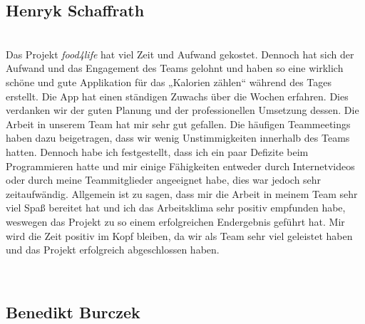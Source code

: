 \subsection{Henryk Schaffrath}\\
Das Projekt
\textit{food4life}  hat viel Zeit und Aufwand gekostet. Dennoch hat sich der Aufwand und das Engagement des Teams gelohnt und haben so eine wirklich schöne und gute Applikation für das „Kalorien zählen“ während des Tages erstellt. Die App hat einen ständigen Zuwachs über die Wochen erfahren. Dies verdanken wir der guten Planung und der professionellen Umsetzung dessen. Die Arbeit in unserem Team hat mir sehr gut gefallen. Die häufigen Teammeetings haben dazu beigetragen, dass wir wenig Unstimmigkeiten innerhalb des Teams hatten. Dennoch habe ich festgestellt, dass ich ein paar Defizite beim Programmieren hatte und mir einige Fähigkeiten entweder durch Internetvideos oder durch meine Teammitglieder angeeignet habe, dies war jedoch sehr zeitaufwändig. 
Allgemein ist zu sagen, dass mir die Arbeit in meinem Team sehr viel Spaß bereitet hat und ich das Arbeitsklima sehr positiv empfunden habe, weswegen das Projekt zu so einem erfolgreichen Endergebnis geführt hat. Mir wird die Zeit positiv im Kopf bleiben, da wir als Team sehr viel geleistet haben und das Projekt erfolgreich abgeschlossen haben.

\\
\subsection{Benedikt Burczek}\\

\\